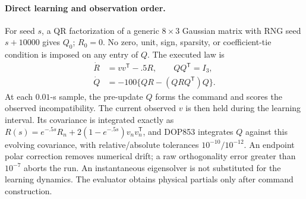 \documentclass[journal]{IEEEtran}
\begin{document}
\paragraph{Direct learning and observation order.}
For seed $s$, a QR factorization of a generic $8\times3$ Gaussian matrix with
RNG seed $s+10000$ gives $Q_0$; $R_0=0$. No zero, unit, sign, sparsity, or
coefficient-tie condition is imposed on any entry of $Q$. The executed law is
\begin{align}
 \dot R&=vv^{\mathsf T}-.5R,\qquad QQ^{\mathsf T}=I_3,\nonumber\\
 \dot Q&=-100\{QR-(QRQ^{\mathsf T})Q\}.
 \label{eq:direct_contact_law}
\end{align}
At each $0.01$-s sample, the pre-update $Q$ forms the command and scores the
observed incompatibility. The current observed $v$ is then held during the
learning interval. Its covariance is integrated exactly as
$R(s)=e^{-.5s}R_n+2(1-e^{-.5s})v_nv_n^{\mathsf T}$, and DOP853 integrates
$Q$ against this evolving covariance, with relative/absolute tolerances
$10^{-10}/10^{-12}$. An endpoint polar correction removes numerical drift;
a raw orthogonality error greater than $10^{-7}$ aborts the run. An
instantaneous eigensolver is not substituted for the learning dynamics.
The evaluator obtains physical partials only after command construction.
\end{document}
